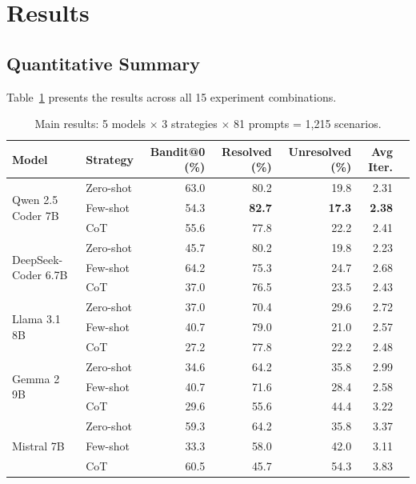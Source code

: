 \documentclass[12pt,a4paper]{article}
\begin{document}
\section{Results}
\label{sec:results}

\subsection{Quantitative Summary}
Table~\ref{tab:main_results} presents the results across all 15 experiment combinations.

\begin{table}[H]
\centering
\caption{Main results: 5 models $\times$ 3 strategies $\times$ 81 prompts = 1,215 scenarios.}
\label{tab:main_results}
\small
\begin{tabular}{llrrrrr}
\toprule
\textbf{Model} & \textbf{Strategy} & \textbf{Bandit@0 (\%)} & \textbf{Resolved (\%)} & \textbf{Unresolved (\%)} & \textbf{Avg Iter.} \\
\midrule
\multirow{3}{*}{Qwen 2.5 Coder 7B}
  & Zero-shot & 63.0 & 80.2 & 19.8 & 2.31 \\
  & Few-shot  & 54.3 & \textbf{82.7} & \textbf{17.3} & \textbf{2.38} \\
  & CoT       & 55.6 & 77.8 & 22.2 & 2.41 \\
\midrule
\multirow{3}{*}{DeepSeek-Coder 6.7B}
  & Zero-shot & 45.7 & 80.2 & 19.8 & 2.23 \\
  & Few-shot  & 64.2 & 75.3 & 24.7 & 2.68 \\
  & CoT       & 37.0 & 76.5 & 23.5 & 2.43 \\
\midrule
\multirow{3}{*}{Llama 3.1 8B}
  & Zero-shot & 37.0 & 70.4 & 29.6 & 2.72 \\
  & Few-shot  & 40.7 & 79.0 & 21.0 & 2.57 \\
  & CoT       & 27.2 & 77.8 & 22.2 & 2.48 \\
\midrule
\multirow{3}{*}{Gemma 2 9B}
  & Zero-shot & 34.6 & 64.2 & 35.8 & 2.99 \\
  & Few-shot  & 40.7 & 71.6 & 28.4 & 2.58 \\
  & CoT       & 29.6 & 55.6 & 44.4 & 3.22 \\
\midrule
\multirow{3}{*}{Mistral 7B}
  & Zero-shot & 59.3 & 64.2 & 35.8 & 3.37 \\
  & Few-shot  & 33.3 & 58.0 & 42.0 & 3.11 \\
  & CoT       & 60.5 & 45.7 & 54.3 & 3.83 \\
\bottomrule
\end{tabular}
\end{table}
\end{document}
